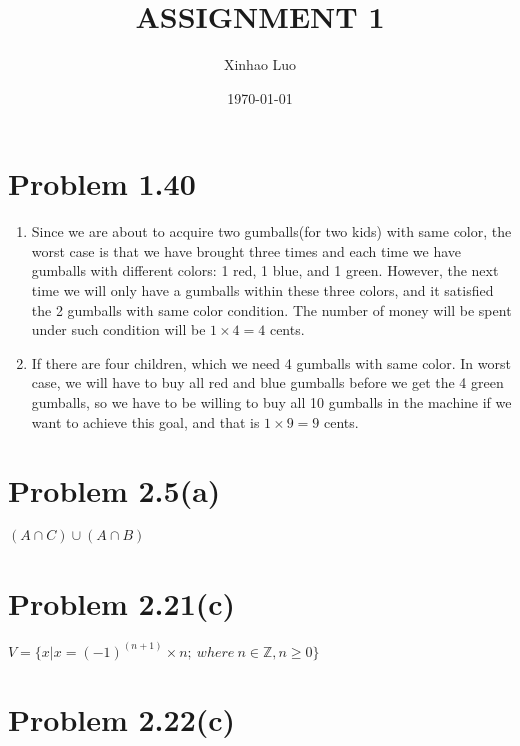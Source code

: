 \documentclass{article}
\title{\bf \Large ASSIGNMENT 1}
\author{Xinhao Luo}
\date{\today}
\def\math#1{$#1$}
\begin{document}
\maketitle
\medskip

\section{Problem 1.40 }
\begin{enumerate}
    \item Since we are about to acquire two gumballs(for two kids) with same color, the worst case is that we have brought three times and each time we have gumballs with different colors: 1 red, 1 blue, and 1 green. However, the next time we will only have a gumballs within these three colors, and it satisfied the 2 gumballs with same color condition. The number of money will be spent under such condition will be \math{1 \times 4 = 4} cents.
    \item If there are four children, which we need 4 gumballs with same color. In worst case, we will have to buy all red and blue gumballs before we get the 4 green gumballs, so we have to be willing to buy all 10 gumballs in the machine if we want to achieve this goal, and that is \math{1 \times 9 = 9} cents.
\end{enumerate}

\section{Problem 2.5(a)}

\math{(A \cap C)\cup(A \cap B)}

\section{Problem 2.21(c)}

\math{V = \{x|x = {(-1)}^{(n+1)} \times n; \ where \ n \in \mathbb{Z}, n \geq 0\}}

\section{Problem 2.22(c)}

\end{document}
